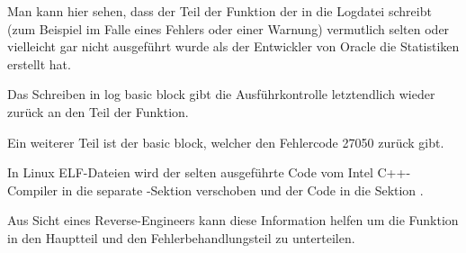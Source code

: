 Man kann hier sehen, dass der Teil der Funktion der in die Logdatei schreibt (zum
Beispiel im Falle eines Fehlers oder einer Warnung) vermutlich selten oder vielleicht
gar nicht ausgeführt wurde als der Entwickler von Oracle die Statistiken erstellt hat.

Das Schreiben in log basic block gibt die Ausführkontrolle letztendlich wieder zurück
an den  Teil der Funktion.

Ein weiterer  Teil ist der \gls{basic block}, welcher den Fehlercode
27050 zurück gibt.

In Linux ELF-Dateien wird der selten ausgeführte Code vom Intel C++-Compiler in die
separate -Sektion verschoben und der  Code in die Sektion
.

Aus Sicht eines Reverse-Engineers kann diese Information helfen um die Funktion in
den Hauptteil und den Fehlerbehandlungsteil zu unterteilen.
